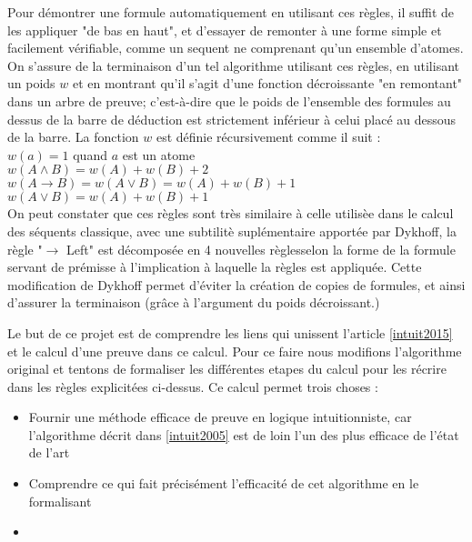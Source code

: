 Pour d\'emontrer une formule automatiquement en utilisant ces r\`egles, il suffit de les appliquer "de bas en haut", et d'essayer de remonter \`a une forme simple et facilement v\'erifiable, comme un sequent ne comprenant qu'un ensemble d'atomes.
On s'assure de la terminaison d'un tel algorithme utilisant ces r\`egles, en utilisant un poids $w$ et en montrant qu'il s'agit d'une fonction d\'ecroissante "en remontant" dans un arbre de preuve; c'est-\`a-dire que le poids de l'ensemble des formules au dessus de la barre de d\'eduction est strictement inférieur à celui plac\'e au dessous de la barre. La fonction $w$ est d\'efinie r\'ecursivement comme il suit : \\
$w(a) = 1$ quand $a$ est un atome \\
$w(A \land B) = w(A) + w(B) + 2 $ \\
$w(A \to B ) = w(A \lor B) = w(A) + w(B) + 1$\\
$w(A \lor B) = w(A) + w(B) + 1$\\

On peut constater que ces r\`egles sont tr\`es similaire \`a celle utilis\`ee dans le calcul des s\'equents classique, avec une subtilit\`e supl\'ementaire apport\'ee par Dykhoff, la r\`egle "$\to$ Left" est d\'ecompos\'ee en 4 nouvelles r\`eglesselon la forme de la formule servant de pr\'emisse à l'implication à laquelle la r\`egles est appliqu\'ee. Cette modification de Dykhoff permet d'\'eviter la cr\'eation de copies de formules, et ainsi d'assurer la terminaison (gr\^ace \`a l'argument du poids d\'ecroissant.)

Le but de ce projet est de comprendre les liens qui unissent l'article \ref{intuit2015} et le calcul d'une preuve dans ce calcul. Pour ce faire nous modifions l'algorithme original et tentons de formaliser les diff\'erentes etapes du calcul pour les r\'ecrire dans les r\`egles explicit\'ees ci-dessus. Ce calcul permet trois choses :

\begin{itemize}
\item Fournir une m\'ethode efficace de preuve en logique intuitionniste, car l'algorithme d\'ecrit dans \ref{intuit2005} est de loin l'un des plus efficace de l'\'etat de l'art
\item Comprendre ce qui fait pr\'ecis\'ement l'efficacit\'e de cet algorithme en le formalisant
\item [TROUVER UNE TROISIEME RAISON]
  
\end{itemize}
